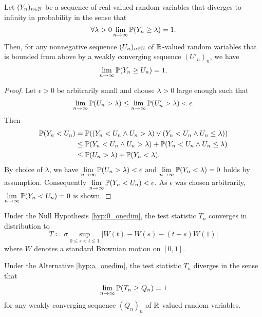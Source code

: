 \begin{lemma} \label{lemma: probability one diverging sequence}
    Let $(Y_n)_{n \in \mathbb{N}}$ be a sequence of real-valued random variables that diverges to infinity in probability in the sense that
    \[ \forall \lambda > 0 \lim\limits_{n \to \infty} \mathbb{P}(Y_n \geq \lambda) = 1. \]
    Then, for any nonnegative sequence $(U_n)_{n \in \mathbb{N}}$ of $\mathbb{R}$-valued random variables that is bounded from above by a weakly converging sequence $(U'_n)_n$, we have 
    \[ \lim\limits_{n \to \infty} \mathbb{P}(Y_n \geq U_n) = 1. \]
\end{lemma}
\begin{proof}
    Let $\epsilon > 0$ be arbitrarily small and choose $\lambda > 0$ large enough such that 
    \[ \lim\limits_{n \to \infty} \mathbb{P}(U_n > \lambda) \leq \lim\limits_{n \to \infty} \mathbb{P}(U'_n > \lambda) < \epsilon. \] Then
    \begin{align*}
        \mathbb{P}(Y_n < U_n)
        & = \mathbb{P}((Y_n < U_n \land U_n > \lambda) \lor (Y_n < U_n \land U_n \leq \lambda)) \\
        & \leq \mathbb{P}(Y_n < U_n \land U_n > \lambda) + \mathbb{P}(Y_n < U_n \land U_n \leq \lambda) \\
        & \leq \mathbb{P}(U_n > \lambda) + \mathbb{P}(Y_n < \lambda).
    \end{align*}
    By choice of $\lambda$, we have $\lim\limits_{n\to \infty} \mathbb{P}(U_n > \lambda) < \epsilon$ and $\lim\limits_{n \to \infty} \mathbb{P}(Y_n < \lambda) = 0$ holds by assumption. Consequently $\lim\limits_{n \to \infty} \mathbb{P}(Y_n < U_n) < \epsilon$. As $\epsilon$ was chosen arbitrarily, $\lim\limits_{n \to \infty} \mathbb{P}(Y_n < U_n) = 0$ is shown.
\end{proof}


\begin{thm} \label{thm:main results one dimensional case}
    \begin{aufzi}
        \item Under the Null Hypothesis \ref{hyp:0_onedim}, the test statistic $T_n$ converges in distribution to 
        \begin{equation} \label{Tn convergence under null hypothesis one dimensional case}
             T \coloneqq \sigma \sup\limits_{0 \leq s < t \leq 1} \left| W(t) - W(s) - (t-s) W(1) \right| 
        \end{equation}
        where $W$ denotes a standard Brownian motion on $[0, 1]$.
        \item Under the Alternative \ref{hyp:a_onedim}, the test statistic $T_n$ diverges in the sense that
        \begin{equation} \label{T_n alternative one dimensional case}
            \lim\limits_{n \to \infty} \mathbb{P}(T_n \geq Q_n) = 1
        \end{equation}
        for any weakly converging sequence $(Q_n)_n$ of $\mathbb{R}$-valued random variables.
    \end{aufzi}
\end{thm}


